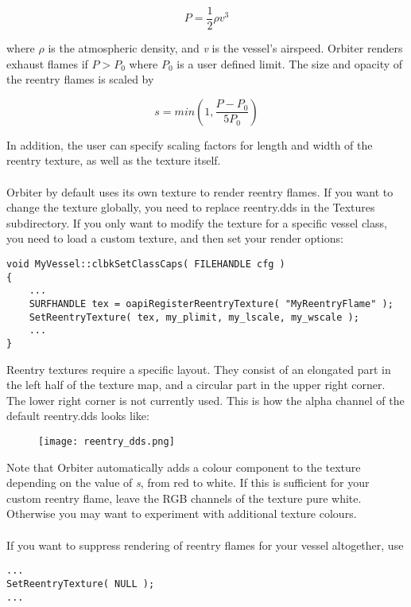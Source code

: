 \documentclass[Orbiter Developer Manual.tex]{subfiles}
\begin{document}
\[ P = \frac{1}{2} \rho v^{3} \]

\noindent
where $\rho$ is the atmospheric density, and \textit{v} is the vessel's airspeed. Orbiter renders exhaust flames if $P > P_{0}$ where $P_{0}$ is a user defined limit. The size and opacity of the reentry flames is scaled by

\[ s = min\left(1,\frac{P - P_{0}}{5P_{0}}\right) \]

\noindent
In addition, the user can specify scaling factors for length and width of the reentry texture, as well as the texture itself.\\
\\
Orbiter by default uses its own texture to render reentry flames. If you want to change the texture globally, you need to replace reentry.dds in the Textures subdirectory. If you only want to modify the texture for a specific vessel class, you need to load a custom texture, and then set your render options:

\begin{lstlisting}
void MyVessel::clbkSetClassCaps( FILEHANDLE cfg )
{
	...
	SURFHANDLE tex = oapiRegisterReentryTexture( "MyReentryFlame" );
	SetReentryTexture( tex, my_plimit, my_lscale, my_wscale );
	...
}
\end{lstlisting}

\noindent
Reentry textures require a specific layout. They consist of an elongated part in the left half of the texture map, and a circular part in the upper right corner. The lower right corner is not currently used. This is how the alpha channel of the default reentry.dds looks like:

\begin{figure}[H]
  \centering
  \texttt{[image: reentry\_dds.png]}
\end{figure}

\noindent
Note that Orbiter automatically adds a colour component to the texture depending on the value of \textit{s}, from red to white. If this is sufficient for your custom reentry flame, leave the RGB channels of the texture pure white. Otherwise you may want to experiment with additional texture colours.\\
\\
If you want to suppress rendering of reentry flames for your vessel altogether, use

\begin{lstlisting}
...
SetReentryTexture( NULL );
...
\end{lstlisting}
\end{document}
